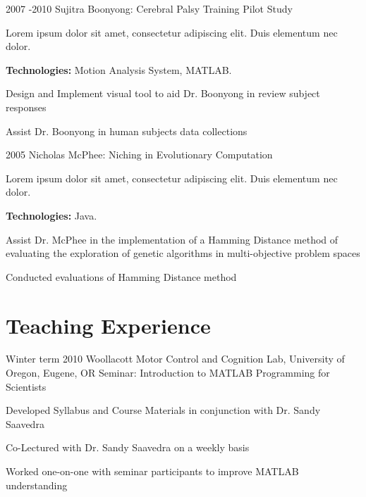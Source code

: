 \documentclass[10pt]{article} %
\begin{document}
\begin{itemize-noindent}

\job
{2007 -}{2010}
{Sujitra Boonyong: Cerebral Palsy Training Pilot Study}
{Lorem ipsum dolor sit amet, consectetur adipiscing elit. Duis elementum nec dolor. \\
\rule{0mm}{5mm}\textbf{Technologies:} Motion Analysis System, MATLAB.}

\begin{itemize-noindent}
\item{Design and Implement visual tool to aid Dr. Boonyong in review subject responses}
\item{Assist Dr. Boonyong in human subjects data collections}
\end{itemize-noindent}


\job
{2005}
{Nicholas McPhee: Niching in Evolutionary Computation}
{Lorem ipsum dolor sit amet, consectetur adipiscing elit. Duis elementum nec dolor. \\
\rule{0mm}{5mm}\textbf{Technologies:} Java.}

\begin{itemize-noindent}
\item{Assist Dr. McPhee in the implementation of a Hamming Distance method of evaluating the exploration of genetic algorithms in multi-objective problem spaces}
\item{Conducted evaluations of Hamming Distance method}
\end{itemize-noindent}


\section{Teaching Experience}

\job
{Winter term 2010}
{Woollacott Motor Control and Cognition Lab, University of Oregon, Eugene, OR}
{Seminar: Introduction to MATLAB Programming for Scientists}

\begin{itemize-noindent}
\item{Developed Syllabus and Course Materials in conjunction with Dr. Sandy Saavedra}
\item{Co-Lectured with Dr. Sandy Saavedra on a weekly basis}
\item{Worked one-on-one with seminar participants to improve MATLAB understanding}
\end{itemize-noindent}


\end{itemize-noindent}
\end{document}
